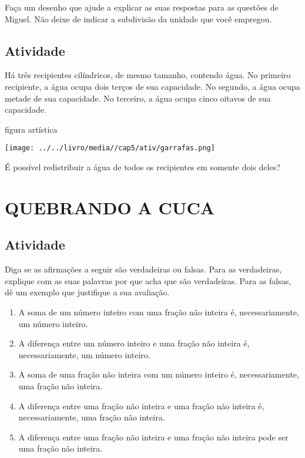 \documentclass[a4,12pt]{book}
\begin{document}
Faça um desenho que ajude a explicar as suas respostas para as questões de Miguel. Não deixe de indicar a subdivisão da unidade que você empregou.

\subsection{Atividade}

Há três recipientes cilíndricos, de mesmo tamanho, contendo água. No primeiro recipiente, a água ocupa dois terços de sua capacidade. No segundo, a água ocupa metade de sua capacidade. No terceiro, a água ocupa cinco oitavos de sua capacidade.  
\begin{imagem*}[breakable]{}{}  
  figura artística  
  
    \texttt{[image: ../../livro/media//cap5/ativ/garrafas.png]}  
\end{imagem*}

É possível redistribuir a água de todos os recipientes em somente dois deles?

\section{QUEBRANDO A CUCA }

\subsection{Atividade}

Diga se as afirmações a seguir são verdadeiras ou falsas. Para as verdadeiras, explique com as suas palavras por que acha que são verdadeiras. Para as falsas, dê um exemplo que justifique a sua avaliação.
\begin{enumerate} [\quad a)] %
  \item     A soma de um número inteiro com uma fração não inteira é, necessariamente, um número inteiro.
  \item     A diferença entre um número inteiro e uma fração não inteira é, necessariamente, um número inteiro.
  \item     A soma de uma fração não inteira com um número inteiro é, necessariamente, uma fração não inteira.
  \item     A diferença entre uma fração não inteira e uma fração não inteira é, necessariamente, uma fração não inteira.
  \item     A diferença entre uma fração não inteira e uma fração não inteira pode ser uma fração não inteira.
\end{enumerate} %
\end{document}
